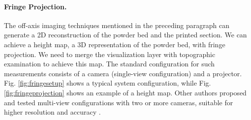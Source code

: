 \paragraph{Fringe Projection.} The off-axis imaging techniques mentioned in the preceding paragraph can generate a 2D reconstruction of the powder bed and the printed section. We can achieve a height map, a 3D representation of the powder bed, with fringe projection. We need to merge the visualization layer with topographic examination to achieve this map. The standard configuration for such measurements consists of a camera (single-view configuration) and a projector. Fig. \ref{fig:fringesetup} shows a typical system configuration, while Fig. \ref{fig:fringeprojection} shows an example of a height map.
Other authors proposed and tested multi-view configurations with two or more cameras, suitable for higher resolution and accuracy \cite{kalms_new_2019}.
